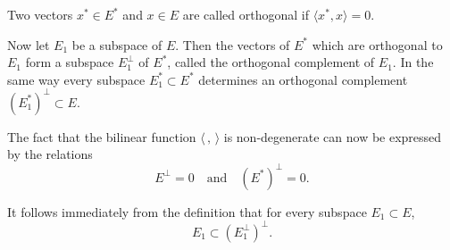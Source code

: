 Two vectors $x^* \in E^*$ and $x \in E$ are called orthogonal if $\langle x^*, x \rangle = 0$.

Now let $E_1$ be a subspace of $E$. Then the vectors of $E^*$ which are orthogonal to $E_1$ form a subspace $E_1^\perp$ of $E^*$, called the orthogonal complement of $E_1$. In the same way every subspace $E_1^* \subset E^*$ determines an orthogonal complement $(E_1^*)^\perp \subset E$.

The fact that the bilinear function $\langle \, , \, \rangle$ is non-degenerate can now be expressed by the relations
$$E^\perp = 0 \quad \text{and} \quad (E^*)^\perp = 0.$$

It follows immediately from the definition that for every subspace $E_1 \subset E$,
$$E_1 \subset (E_1^\perp)^\perp.$$
